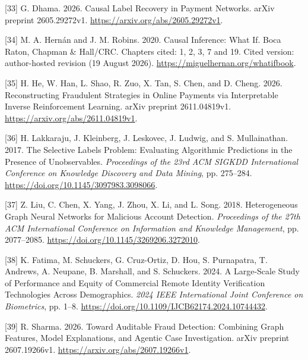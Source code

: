 \documentclass[
  11pt,
]{article}
\newlength{\cslhangindent}
\newlength{\cslentryspacingunit} %
\newenvironment{CSLReferences}[2] %
 {%
  \setlength{\parindent}{0pt}
  \ifodd #1
  \let\oldpar\par
  \def\par{\hangindent=\cslhangindent\oldpar}
  \fi
  \setlength{\parskip}{#2\cslentryspacingunit}
 }%
 {}
\begin{document}
\begin{CSLReferences}{1}{1}
\leavevmode{}%
{[}33{]} G. Dhama. 2026. Causal Label Recovery in Payment Networks.
arXiv preprint 2605.29272v1. \url{https://arxiv.org/abs/2605.29272v1}.

\leavevmode{}%
{[}34{]} M. A. Hernán and J. M. Robins. 2020. Causal Inference: What If.
Boca Raton, Chapman \& Hall/CRC. Chapters cited: 1, 2, 3, 7 and 19.
Cited version: author-hosted revision (19 August 2026).
\url{https://miguelhernan.org/whatifbook}.

\leavevmode{}%
{[}35{]} H. He, W. Han, L. Shao, R. Zuo, X. Tan, S. Chen, and D. Cheng.
2026. Reconstructing Fraudulent Strategies in Online Payments via
Interpretable Inverse Reinforcement Learning. arXiv preprint
2611.04819v1. \url{https://arxiv.org/abs/2611.04819v1}.

\leavevmode{}%
{[}36{]} H. Lakkaraju, J. Kleinberg, J. Leskovec, J. Ludwig, and S.
Mullainathan. 2017. The Selective Labels Problem: Evaluating Algorithmic
Predictions in the Presence of Unobservables. \emph{Proceedings of the
23rd ACM SIGKDD International Conference on Knowledge Discovery and Data
Mining}, pp. 275--284. \url{https://doi.org/10.1145/3097983.3098066}.

\leavevmode{}%
{[}37{]} Z. Liu, C. Chen, X. Yang, J. Zhou, X. Li, and L. Song. 2018.
Heterogeneous Graph Neural Networks for Malicious Account Detection.
\emph{Proceedings of the 27th ACM International Conference on
Information and Knowledge Management}, pp. 2077--2085.
\url{https://doi.org/10.1145/3269206.3272010}.

\leavevmode{}%
{[}38{]} K. Fatima, M. Schuckers, G. Cruz-Ortiz, D. Hou, S. Purnapatra,
T. Andrews, A. Neupane, B. Marshall, and S. Schuckers. 2024. A
Large-Scale Study of Performance and Equity of Commercial Remote
Identity Verification Technologies Across Demographics. \emph{2024 IEEE
International Joint Conference on Biometrics}, pp. 1--8.
\url{https://doi.org/10.1109/IJCB62174.2024.10744432}.

\leavevmode{}%
{[}39{]} R. Sharma. 2026. Toward Auditable Fraud Detection: Combining
Graph Features, Model Explanations, and Agentic Case Investigation.
arXiv preprint 2607.19266v1. \url{https://arxiv.org/abs/2607.19266v1}.


\end{CSLReferences}
\end{document}
